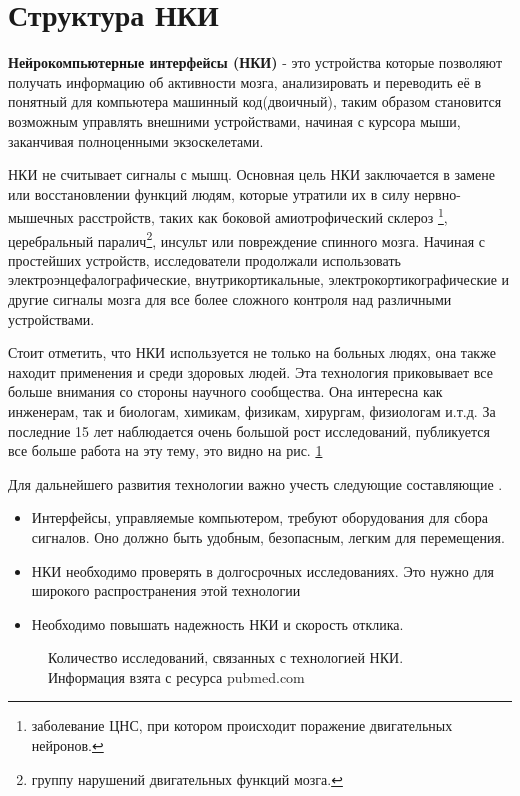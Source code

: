 \newpage

\section{Структура НКИ}
{\bf Нейрокомпьютерные интерфейсы (НКИ)} - это устройства которые позволяют получать информацию об активности мозга, анализировать и переводить её в понятный для компьютера машинный код(двоичный), таким образом становится возможным управлять внешними устройствами, начиная с курсора мыши, заканчивая полноценными экзоскелетами. 

 НКИ не считывает сигналы с мышц. Основная цель НКИ заключается в замене или восстановлении функций людям, которые утратили их в силу нервно-мышечных расстройств, таких как боковой амиотрофический склероз \footnote{заболевание ЦНС, при котором происходит поражение двигательных нейронов.}, церебральный паралич\footnote{ группу нарушений двигательных функций мозга.}, инсульт или повреждение спинного мозга. Начиная с простейших устройств, исследователи продолжали использовать электроэнцефалографические, внутрикортикальные, электрокортикографические и другие сигналы мозга для все более сложного контроля над различными устройствами. 
 
 Стоит отметить, что НКИ используется не только на больных людях, она также находит применения и среди здоровых людей. Эта технология приковывает все больше внимания со стороны научного сообщества. Она интересна как инженерам, так и  биологам, химикам, физикам, хирургам, физиологам и.т.д. За последние 15 лет наблюдается очень большой рост исследований, публикуется все больше работа на эту тему, это видно на рис. \ref{papers}
  
 Для дальнейшего развития технологии важно учесть следующие составляющие . 
 
 \begin{itemize}
 	\item Интерфейсы, управляемые компьютером, требуют оборудования для сбора сигналов. Оно должно быть удобным, безопасным, легким для перемещения.
 	\item НКИ необходимо проверять в долгосрочных исследованиях. Это нужно для широкого распространения этой технологии
 	\item Необходимо повышать надежность НКИ и скорость отклика. 
 \end{itemize}

\begin{figure}[h]
	\center	{\texttt{[image: 6]}}
	\caption{Количество исследований, связанных с технологией НКИ. Информация взята с ресурса pubmed.com}
	\label{papers}
\end{figure} 



